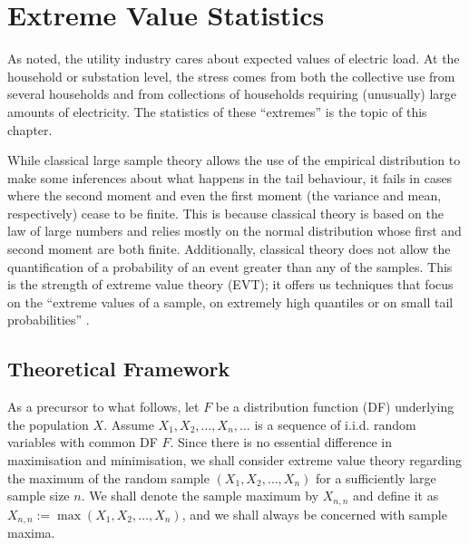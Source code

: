 
\chapter{Extreme Value Statistics} 
As \cite{hong16} noted, the utility industry cares about expected values of electric load. At the household or substation level, the stress comes from both the collective use from several households and from collections of households requiring (unusually) large amounts of electricity. The statistics of these ``extremes'' is the topic of this chapter.

While classical large sample theory allows the use of the empirical distribution to make some inferences about what happens in the tail behaviour, it fails in cases where the second moment and even the first moment (the variance and mean, respectively) cease to be finite. This is because classical theory is based on the law of large numbers and relies mostly on the normal distribution whose first and second moment are both finite. Additionally, classical theory does not allow the quantification of a probability of an event greater than any of the samples. This is the strength of extreme value theory (EVT); it offers us techniques that focus on the ``extreme values of a sample, on extremely high quantiles or on small tail probabilities'' \cite[ch.~1]{beirlant}.

\section{Theoretical Framework} \label{subsec:EVT}

As a precursor to what follows, let $F$ be a distribution function (DF) underlying the population $X$. Assume $X_1,X_2, \ldots, X_n, \ldots$ is a sequence of i.i.d. random variables with common DF $F$. Since there is no essential difference in maximisation and minimisation, we shall consider extreme value theory regarding the maximum of the random sample $(X_1,X_2, \ldots, X_n)$ for a sufficiently large sample size $n$. We shall denote the sample maximum by $X_{n,n}$ and define it as $X_{n,n}:= \max(X_1,X_2, \ldots, X_n)$, and we shall always be concerned with sample maxima.

